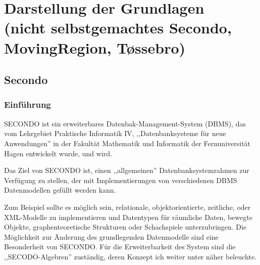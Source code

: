 
\chapter[Darstellung der Grundlagen \anmerkung{30-40 Seiten}]{Darstellung der Grundlagen\\
\normalsize{(nicht selbstgemachtes
Secondo,
MovingRegion,
T\o{}ssebro)}} \label{Kapitel2}
\minitoc
\newpage
\section{Secondo }\label{SecondoEinfuehrung}

\subsection{Einführung}
SECONDO ist ein erweiterbares Datenbak-Management-System (DBMS), das vom Lehrgebiet Praktische Informatik IV, ,,Datenbanksysteme für neue Anwendungen'' in der Fakultät Mathematik und Informatik der Fernuniversität Hagen entwickelt wurde, und wird.

Das Ziel von SECONDO ist, einen ,,allgemeinen'' Datenbanksystemrahmen zur Verfügung zu stellen, der mit Implementierungen von verschiedenen DBMS Datenmodellen gefüllt werden kann.

Zum Beispiel sollte es möglich sein, relationale, objektorientierte, zeitliche, oder XML-Modelle zu implementieren und Datentypen für räumliche Daten, bewegte Objekte, graphenteoretische Strukturen oder Schachspiele unterzubringen. Die Möglichkeit zur Änderung des grundlegenden Datenmodelle sind eine Besonderheit von SECONDO. Für die Erweiterbarkeit des System sind die ,,SECODO-Algebren'' zuständig, deren Konzept ich weiter unter näher beleuchte.

